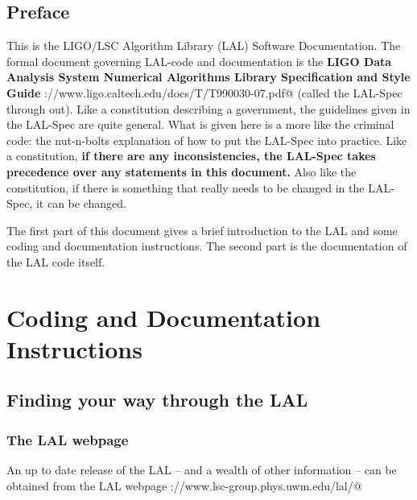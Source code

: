 \documentclass[oneside]{book}
\begin{document}
\tableofcontents

\chapter*{Preface}
This is the LIGO/LSC Algorithm Library (LAL) Software Documentation.
The formal document governing LAL-code and documentation is the {\bf
LIGO Data Analysis System Numerical Algorithms Library Specification
and Style Guide}
\verb@http://www.ligo.caltech.edu/docs/T/T990030-07.pdf@ (called the
LAL-Spec through out).  Like a constitution describing a government,
the guidelines given in the LAL-Spec are quite general. What is given
here is a more like the criminal code: the nut-n-bolts explanation of
how to put the LAL-Spec into practice.  Like a constitution, {\bf if
there are any inconsistencies,  the LAL-Spec takes precedence over any
statements in this document.} Also like the constitution, if there is
something that really needs to be changed in the LAL-Spec, it can be
changed.

The first part of this document gives a brief introduction to the LAL
and some coding and documentation instructions.  The second part is
the documentation of the LAL code itself.

\part{Coding and Documentation Instructions}

\chapter{Finding your way through the LAL}

\section{The LAL webpage}

An up to date release  of the LAL -- and a wealth of other information
-- can be obtained from the LAL webpage
\verb@http://www.lsc-group.phys.uwm.edu/lal/@
\end{document}
